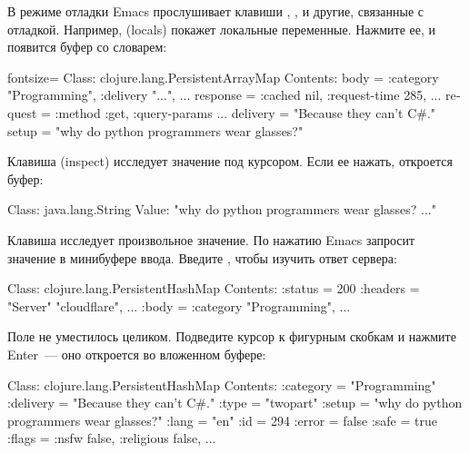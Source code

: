 В режиме отладки Emacs прослушивает клавиши , ,  и другие, связанные с отладкой. Например,  (locals) покажет локальные переменные. Нажмите ее, и появится буфер со словарем:

\begin{english}
  \begin{clojure*}{fontsize=\small}
Class: clojure.lang.PersistentArrayMap
Contents:
  body = { :category "Programming", :delivery "...",  ... }
  response = { :cached nil, :request-time 285,  ... }
  request = { :method :get, :query-params ... }
  delivery = "Because they can't C#."
  setup = "why do python programmers wear glasses?"
  \end{clojure*}
\end{english}

Клавиша  (inspect) исследует значение под курсором. Если ее нажать, откроется буфер:

\begin{english}
  \begin{text}
Class: java.lang.String
Value: "why do python programmers wear glasses? ..."
  \end{text}
\end{english}

Клавиша  исследует произвольное значение. По нажатию Emacs запросит значение в минибуфере ввода. Введите , чтобы изучить ответ сервера:

\begin{english}
  \begin{clojure}
Class: clojure.lang.PersistentHashMap
Contents:
  :status = 200
  :headers = { "Server" "cloudflare", ... }
  :body = { :category "Programming",  ... }
  \end{clojure}
\end{english}

Поле  не уместилось целиком. Подведите курсор к фигурным скобкам и нажмите Enter~--- оно откроется во вложенном буфере:

\begin{english}
  \begin{clojure}
Class: clojure.lang.PersistentHashMap
Contents:
  :category = "Programming"
  :delivery = "Because they can't C#."
  :type = "twopart"
  :setup = "why do python programmers wear glasses?"
  :lang = "en"
  :id = 294
  :error = false
  :safe = true
  :flags = { :nsfw false, :religious false, ... }
  \end{clojure}
\end{english}

